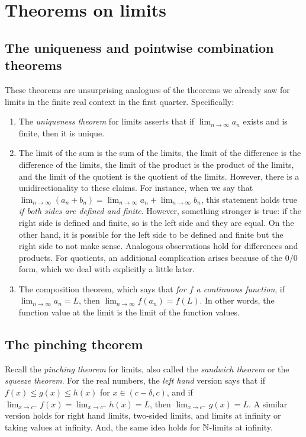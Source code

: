\documentclass[10pt]{amsart}
\begin{document}
\section{Theorems on limits}

\subsection{The uniqueness and pointwise combination theorems}

These theorems are unsurprising analogues of the theorems we already
saw for limits in the finite real context in the first
quarter. Specifically:

\begin{enumerate}
\item The {\em uniqueness theorem} for limits asserts that if $\lim_{n
  \to \infty} a_n$ exists and is finite, then it is unique.
\item The limit of the sum is the sum of the limits, the limit of the
  difference is the difference of the limits, the limit of the product
  is the product of the limits, and the limit of the quotient is the
  quotient of the limits. However, there is a unidirectionality to
  these claims. For instance, when we say that $\lim_{n \to \infty}
  (a_n + b_n) = \lim_{n \to \infty} a_n + \lim_{n \to \infty} b_n$,
  this statement holds true {\em if both sides are defined and
  finite}. However, something stronger is true: if the right side is
  defined and finite, so is the left side and they are equal. On the
  other hand, it is possible for the left side to be defined and
  finite but the right side to not make sense. Analogous observations
  hold for differences and products. For quotients, an additional
  complication arises because of the $0/0$ form, which we deal with
  explicitly a little later.
\item The composition theorem, which says that {\em for $f$ a
  continuous function}, if $\lim_{n \to \infty} a_n = L$, then
  $\lim_{n \to \infty} f(a_n) = f(L)$. In other words, the function
  value at the limit is the limit of the function values.
\end{enumerate}

\subsection{The pinching theorem}

Recall the {\em pinching theorem} for limits, also called the {\em
sandwich theorem} or the {\em squeeze theorem}. For the real numbers,
the {\em left hand} version says that if $f(x) \le g(x) \le h(x)$ for
$x \in (c - \delta, c)$, and if $\lim_{x \to c^-} f(x) = \lim_{x \to
c^-} h(x) = L$, then $\lim_{x \to c^-} g(x) = L$. A similar version
holds for right hand limits, two-sided limits, and limits at infinity
or taking values at infinity. And, the same idea holds for $\mathbb{N}$-limits
at infinity.
\end{document}

